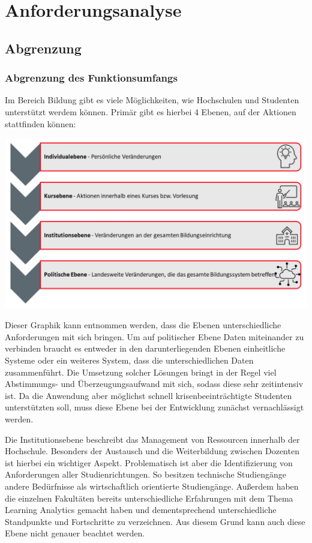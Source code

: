 \chapter{Anforderungsanalyse} %
\section{Abgrenzung}
\subsection{Abgrenzung des Funktionsumfangs}\label{sub:abgrenzung}
Im Bereich Bildung gibt es viele Möglichkeiten, wie Hochschulen und Studenten unterstützt werdem können.
Primär gibt es hierbei 4 Ebenen, auf der Aktionen stattfinden können:
\begin{center}
	\includegraphics[width=\linewidth, keepaspectratio]{img/4LA.png}
\end{center}
Dieser Graphik kann entnommen werden, dass die Ebenen unterschiedliche Anforderungen mit sich bringen. Um auf politischer Ebene Daten miteinander zu verbinden braucht es entweder in den darunterliegenden Ebenen einheitliche Systeme oder ein weiteres System, dass die unterschiedlichen Daten zusammenführt. Die Umsetzung solcher Lösungen bringt in der Regel viel Abstimmungs- und Überzeugungsaufwand mit sich, sodass diese sehr zeitintensiv ist. Da die Anwendung aber möglichst schnell krisenbeeinträchtigte Studenten unterstützten soll, muss diese Ebene bei der Entwicklung zunächst vernachlässigt werden.

Die Institutionsebene beschreibt das Management von Ressourcen innerhalb der Hochschule. Besonders der Austausch und die Weiterbildung zwischen Dozenten ist hierbei ein wichtiger Aspekt. Problematisch ist aber die Identifizierung von Anforderungen aller Studienrichtungen. So besitzen technische Studiengänge andere Bedürfnisse als wirtschaftlich orientierte Studiengänge. Außerdem haben die einzelnen Fakultäten bereits unterschiedliche Erfahrungen mit dem Thema Learning Analytics gemacht haben und dementsprechend unterschiedliche Standpunkte und Fortschritte zu verzeichnen. Aus diesem Grund kann auch diese Ebene nicht genauer beachtet werden.

